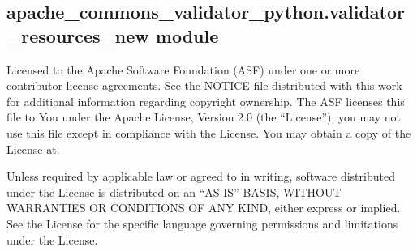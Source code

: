 \documentclass[letterpaper,10pt,english]{sphinxmanual}
\begin{document}
\subsection{apache\_commons\_validator\_python.validator\_resources\_new module}
\label{\detokenize{apache_commons_validator_python:module-apache_commons_validator_python.validator_resources_new}}\label{\detokenize{apache_commons_validator_python:apache-commons-validator-python-validator-resources-new-module}}
\sphinxAtStartPar
Licensed to the Apache Software Foundation (ASF) under one or more contributor
license agreements.  See the NOTICE file distributed with this work for additional
information regarding copyright ownership. The ASF licenses this file to You under the
Apache License, Version 2.0 (the “License”); you may not use this file except in
compliance with the License.  You may obtain a copy of the License at.

\sphinxAtStartPar
{}

\sphinxAtStartPar
Unless required by applicable law or agreed to in writing, software
distributed under the License is distributed on an “AS IS” BASIS,
WITHOUT WARRANTIES OR CONDITIONS OF ANY KIND, either express or implied.
See the License for the specific language governing permissions and
limitations under the License.
\end{document}
